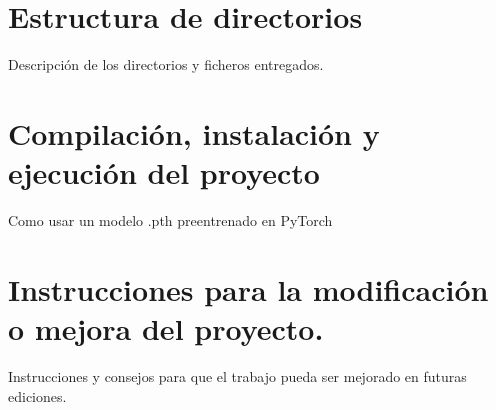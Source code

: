 
\section{Estructura de directorios}

Descripción de los directorios y ficheros entregados.

\section{Compilación, instalación y ejecución del proyecto}

Como usar un modelo .pth preentrenado en PyTorch

\section{Instrucciones para la modificación o mejora del proyecto.}

Instrucciones y consejos para que el trabajo pueda ser mejorado en futuras ediciones.